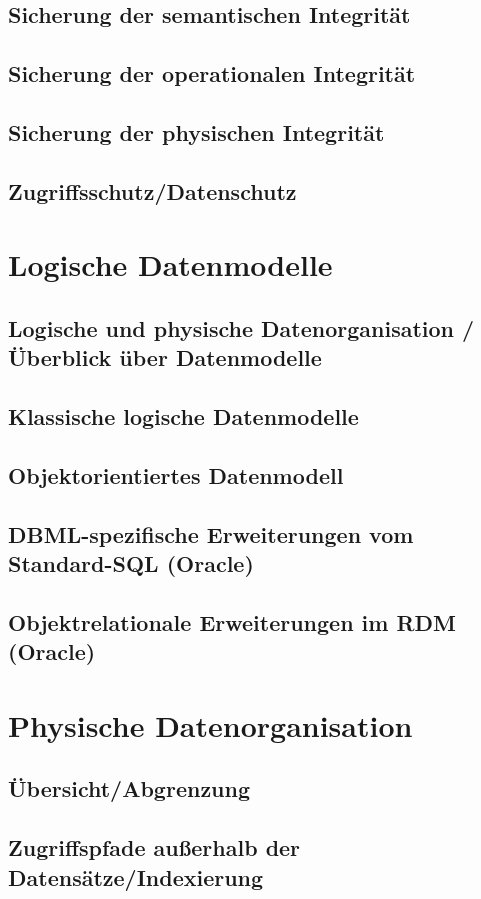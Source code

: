 \section{Sicherung der semantischen Integrität}
\section{Sicherung der operationalen Integrität}
\section{Sicherung der physischen Integrität}
\section{Zugriffsschutz/Datenschutz}

\chapter{Logische Datenmodelle}
\section{Logische und physische Datenorganisation / Überblick über Datenmodelle}
\section{Klassische logische Datenmodelle}
\section{Objektorientiertes Datenmodell}
\section{DBML-spezifische Erweiterungen vom Standard-SQL (Oracle)}
\section{Objektrelationale Erweiterungen im RDM (Oracle)}

\chapter{Physische Datenorganisation}
\section{Übersicht/Abgrenzung}
\section{Zugriffspfade außerhalb der Datensätze/Indexierung}
